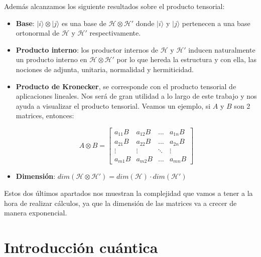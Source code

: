 Además alcanzamos los siguiente resultados sobre el producto tensorial:
\begin{itemize}
    \item \textbf{Base}: $|i\rangle \otimes |j\rangle$ es una base de $\mathscr{H} \otimes \mathscr{H}'$ donde $|i\rangle$ y $|j\rangle$ pertenecen a una base ortonormal de $\mathscr{H}$ y $\mathscr{H}'$ respectivamente. 
    
    \item \textbf{Producto interno}: los productor internos de $\mathscr{H}$ y $\mathscr{H}'$ inducen naturalmente un producto interno en $\mathscr{H} \otimes \mathscr{H}'$ por lo que hereda la estructura y con ella, las nociones de adjunta, unitaria, normalidad y hermiticidad.
    
    \item \textbf{Producto de Kronecker}, se corresponde con el producto tensorial de aplicaciones lineales. Nos será de gran utilidad a lo largo de este trabajo y nos ayuda a visualizar el producto tensorial. Veamos un ejemplo, si $A$ y $B$ son 2 matrices, entonces:\newline

        \begin{equation*}
        A\otimes B = \begin{bmatrix}
        a_{11}B & a_{12}B & ... & a_{1n}B\\
        a_{21}B & a_{22}B & ... & a_{2n}B\\
        \vdots & \vdots & \ddots & \vdots\\
        a_{m1}B & a_{m2}B & ... & a_{mn}B
        \end{bmatrix}
        \end{equation*}

    \vspace{5pt}
    \item \textbf{Dimensión}: $dim(\mathscr{H} \otimes \mathscr{H}')=dim(\mathscr{H})\cdot dim(\mathscr{H}')$
\end{itemize}

Estos dos últimos apartados nos muestran la complejidad que vamos a tener a la hora de realizar cálculos, ya que la dimensión de las matrices va a crecer de manera exponencial.

\newpage

\section{Introducción cuántica}
\label{Sec2.2:Fisica}

